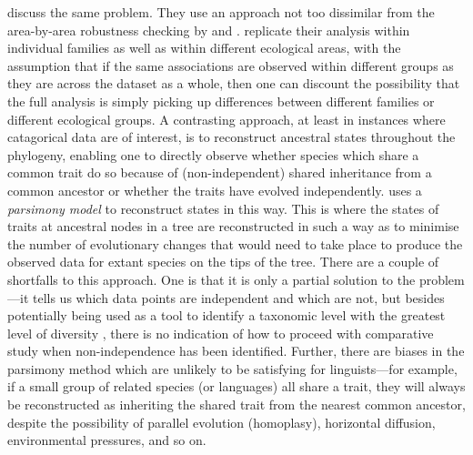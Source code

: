 \textcite[pp.~85--86]{baker_evolution_1979} discuss the same problem. They use an approach not too dissimilar from the area-by-area robustness checking by \textcite{dryer_large_1989} and \textcite{nichols_linguistic_1992}. \textcite{baker_evolution_1979} replicate their analysis within individual families as well as within different ecological areas, with the assumption that if the same associations are observed within different groups as they are across the dataset as a whole, then one can discount the possibility that the full analysis is simply picking up differences between different families or different ecological groups. A contrasting approach, at least in instances where catagorical data are of interest, is to reconstruct ancestral states throughout the phylogeny, enabling one to directly observe whether species which share a common trait do so because of (non-independent) shared inheritance from a common ancestor or whether the traits have evolved independently. \textcite{gittleman_phylogeny_1981} uses a \emph{parsimony model} to reconstruct states in this way. This is where the states of traits at ancestral nodes in a tree are reconstructed in such a way as to minimise the number of evolutionary changes that would need to take place to produce the observed data for extant species on the tips of the tree. There are a couple of shortfalls to this approach. One is that it is only a partial solution to the problem---it tells us which data points are independent and which are not, but besides potentially being used as a tool to identify a taxonomic level with the greatest level of diversity \autocite[proceeding in a similar way to][]{clutton-brock_primate_1977}, there is no indication of how to proceed with comparative study when non-independence has been identified. Further, there are biases in the parsimony method \autocite[p.~7]{felsenstein_phylogenies_1985} which are unlikely to be satisfying for linguists---for example, if a small group of related species (or languages) all share a trait, they will always be reconstructed as inheriting the shared trait from the nearest common ancestor, despite the possibility of parallel evolution (homoplasy), horizontal diffusion, environmental pressures, and so on.


